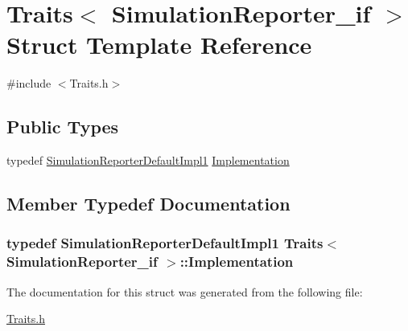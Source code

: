 \hypertarget{struct_traits_3_01_simulation_reporter__if_01_4}{}\section{Traits$<$ Simulation\+Reporter\+\_\+if $>$ Struct Template Reference}
\label{struct_traits_3_01_simulation_reporter__if_01_4}


{\ttfamily \#include $<$Traits.\+h$>$}

\subsection*{Public Types}
\begin{DoxyCompactItemize}
\item 
typedef \hyperlink{class_simulation_reporter_default_impl1}{Simulation\+Reporter\+Default\+Impl1} \hyperlink{struct_traits_3_01_simulation_reporter__if_01_4_a268163ecaa49b2f24986174f9fa08322}{Implementation}
\end{DoxyCompactItemize}


\subsection{Member Typedef Documentation}
\subsubsection[{\texorpdfstring{Implementation}{Implementation}}]{\setlength{\rightskip}{0pt plus 5cm}typedef {\bf Simulation\+Reporter\+Default\+Impl1} {\bf Traits}$<$ {\bf Simulation\+Reporter\+\_\+if} $>$\+::{\bf Implementation}}\hypertarget{struct_traits_3_01_simulation_reporter__if_01_4_a268163ecaa49b2f24986174f9fa08322}{}\label{struct_traits_3_01_simulation_reporter__if_01_4_a268163ecaa49b2f24986174f9fa08322}


The documentation for this struct was generated from the following file\+:\begin{DoxyCompactItemize}
\item 
\hyperlink{_traits_8h}{Traits.\+h}\end{DoxyCompactItemize}

